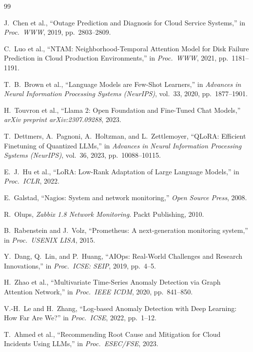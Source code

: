 \documentclass[conference]{IEEEtran}
\begin{document}
\begin{thebibliography}{99}

J.\ Chen et al., ``Outage Prediction and Diagnosis for Cloud Service Systems,'' in \textit{Proc.\ WWW}, 2019, pp.\ 2803--2809.

C.\ Luo et al., ``NTAM: Neighborhood-Temporal Attention Model for Disk Failure Prediction in Cloud Production Environments,'' in \textit{Proc.\ WWW}, 2021, pp.\ 1181--1191.

T.\ B.\ Brown et al., ``Language Models are Few-Shot Learners,'' in \textit{Advances in Neural Information Processing Systems (NeurIPS)}, vol.\ 33, 2020, pp.\ 1877--1901.

H.\ Touvron et al., ``Llama 2: Open Foundation and Fine-Tuned Chat Models,'' \textit{arXiv preprint arXiv:2307.09288}, 2023.

T.\ Dettmers, A.\ Pagnoni, A.\ Holtzman, and L.\ Zettlemoyer, ``QLoRA: Efficient Finetuning of Quantized LLMs,'' in \textit{Advances in Neural Information Processing Systems (NeurIPS)}, vol.\ 36, 2023, pp.\ 10088--10115.

E.\ J.\ Hu et al., ``LoRA: Low-Rank Adaptation of Large Language Models,'' in \textit{Proc.\ ICLR}, 2022.

E.\ Galstad, ``Nagios: System and network monitoring,'' \textit{Open Source Press}, 2008.

R.\ Olups, \textit{Zabbix 1.8 Network Monitoring}. Packt Publishing, 2010.

B.\ Rabenstein and J.\ Volz, ``Prometheus: A next-generation monitoring system,'' in \textit{Proc.\ USENIX LISA}, 2015.

Y.\ Dang, Q.\ Lin, and P.\ Huang, ``AIOps: Real-World Challenges and Research Innovations,'' in \textit{Proc.\ ICSE: SEIP}, 2019, pp.\ 4--5.

H.\ Zhao et al., ``Multivariate Time-Series Anomaly Detection via Graph Attention Network,'' in \textit{Proc.\ IEEE ICDM}, 2020, pp.\ 841--850.

V.-H.\ Le and H.\ Zhang, ``Log-based Anomaly Detection with Deep Learning: How Far Are We?'' in \textit{Proc.\ ICSE}, 2022, pp.\ 1--12.

T.\ Ahmed et al., ``Recommending Root Cause and Mitigation for Cloud Incidents Using LLMs,'' in \textit{Proc.\ ESEC/FSE}, 2023.


\end{thebibliography}
\end{document}
